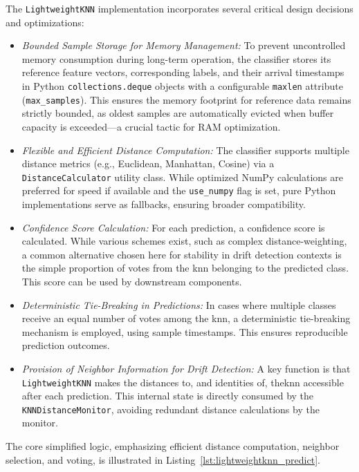 The \texttt{LightweightKNN} implementation incorporates several critical design decisions and optimizations:
\begin{itemize}
    \item \textit{Bounded Sample Storage for Memory Management:} To prevent uncontrolled memory consumption during long-term operation, the classifier stores its reference feature vectors, corresponding labels, and their arrival timestamps in Python \texttt{collections.deque} objects with a configurable \texttt{maxlen} attribute (\texttt{max\_samples}). This ensures the memory footprint for reference data remains strictly bounded, as oldest samples are automatically evicted when buffer capacity is exceeded—a crucial tactic for RAM optimization.
    \item \textit{Flexible and Efficient Distance Computation:} The classifier supports multiple distance metrics (e.g., Euclidean, Manhattan, Cosine) via a \texttt{DistanceCalculator} utility class. While optimized NumPy calculations are preferred for speed if available and the \texttt{use\_numpy} flag is set, pure Python implementations serve as fallbacks, ensuring broader compatibility.
    \item \textit{Confidence Score Calculation:} For each prediction, a confidence score is calculated. While various schemes exist, such as complex distance-weighting, a common alternative chosen here for stability in drift detection contexts is the simple proportion of votes from the \gls{knn} belonging to the predicted class. This score can be used by downstream components.
    \item \textit{Deterministic Tie-Breaking in Predictions:} In cases where multiple classes receive an equal number of votes among the \gls{knn}, a deterministic tie-breaking mechanism is employed, using sample timestamps. This ensures reproducible prediction outcomes.
    \item \textit{Provision of Neighbor Information for Drift Detection:} A key function is that \texttt{LightweightKNN} makes the distances to, and identities of, the\gls{knn} accessible after each prediction. This internal state is directly consumed by the \texttt{KNNDistanceMonitor}, avoiding redundant distance calculations by the monitor.
\end{itemize}

The core simplified logic, emphasizing efficient distance computation, neighbor selection, and voting, is illustrated in Listing~\ref{lst:lightweightknn_predict}.

